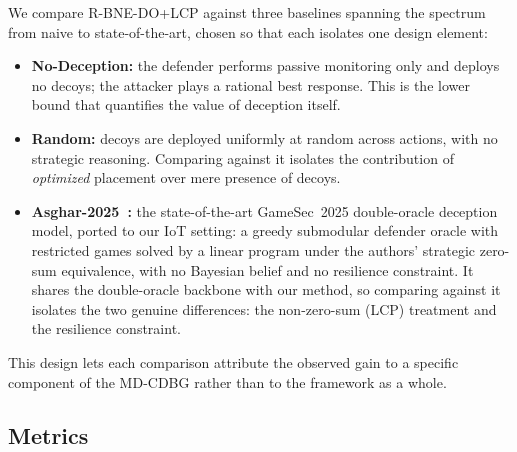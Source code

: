 \documentclass[conference]{IEEEtran}
\begin{document}
We compare R-BNE-DO+LCP against three baselines spanning the spectrum from
naive to state-of-the-art, chosen so that each isolates one design element:
\begin{itemize}
\item \textbf{No-Deception:} the defender performs passive monitoring only and
deploys no decoys; the attacker plays a rational best response. This is the
lower bound that quantifies the value of deception itself.
\item \textbf{Random:} decoys are deployed uniformly at random across actions,
with no strategic reasoning. Comparing against it isolates the contribution of
\emph{optimized} placement over mere presence of decoys.
\item \textbf{Asghar-2025~\cite{asghar2025}:} the state-of-the-art GameSec~2025
double-oracle deception model, ported to our IoT setting: a greedy submodular
defender oracle with restricted games solved by a linear program under the
authors' strategic zero-sum equivalence, with no Bayesian belief and no
resilience constraint. It shares the double-oracle backbone with our method, so
comparing against it isolates the two genuine differences: the non-zero-sum
(LCP) treatment and the resilience constraint.
\end{itemize}
This design lets each comparison attribute the observed gain to a specific
component of the MD-CDBG rather than to the framework as a whole.

\subsection{Metrics}
\end{document}
